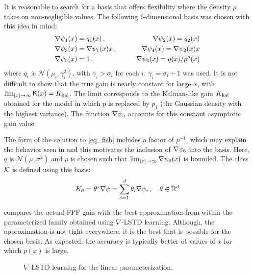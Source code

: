 It is reasonable to search for a basis that offers flexibility where the density $p$ takes on non-negligible values.  The following $6$-dimensional basis was chosen with this idea in mind:
\begin{equation*}
\begin{aligned}
\nabla \psi_{1}(x) & = q_1(x)
\, ,\qquad
&\nabla \psi_{2}(x)  = q_2(x)
\\
\nabla \psi_{3}(x) & = \nabla \psi_{1}(x) x \, ,\qquad
&\nabla \psi_{4}(x)  = \nabla \psi_{2}(x) x \\
\nabla \psi_{5}(x) &= 1 \,  ,\qquad &\nabla \psi_{6}(x) =q(x)/p^{\rho}(x)
\end{aligned}
\end{equation*}
where $q_i$ is $\mathcal{N}(\mu_i,\gamma_i^2)$, with $\gamma_i>\sigma_i$ for each $i$. $\gamma_i=\sigma_i+1$ was used. It is not difficult to show that the true gain is nearly constant for large $x$, with $\lim_{|x|\to\infty} \text{\sf K}(x) = K_{\text{kal}}$. The limit corresponds to the Kalman-like gain $K_{\text{kal}}$ obtained for the model in which $p$ is replaced by $p_1$  (the Gaussian density with the highest variance). The function $\nabla \psi_{5}$ accounts for this constant asymptotic gain value.

The form of the solution to \eqref{eq_fish} includes a factor of $p^{-1}$, which may explain the behavior seen in  and this motivates the inclusion of $\nabla \psi_{6}$ into the basis. Here, $q$ is $\mathcal{N}(\mu,\sigma^{2})$ and $\rho$ is chosen such that $\lim_{|x|\to\infty}\nabla \psi_{6}(x)$ is bounded. The class ${\cal K}$ is defined using this basis:
\begin{equation*}
K_\theta = \theta^{{\hbox{\tiny\it T}}}\nabla \psi = \sum_{i=1}^{d}\theta_{i}\nabla \psi_{i}\,, \quad\theta\in\mathbb{R}^d
\end{equation*}

 compares the actual FPF gain with the best approximation from within the parameterized family obtained using $\nabla$-LSTD learning. Although, the approximation is not tight everywhere, it is the best that is possible for the chosen basis. As expected, the accuracy is typically better at values of $x$ for which $p(x)$ is large.

\begin{figure}[h]
	\caption{$\nabla$-LSTD learning for the linear parameterization.}
	\label{f:lstd}
\end{figure}

